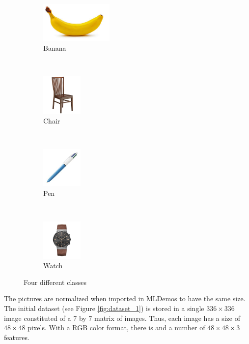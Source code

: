 \documentclass[a4paper,10pt]{article}
\begin{document}
\begin{figure}[H]
\centering
    \begin{subfigure}[t]{0.2\textwidth}
        \centering
        \includegraphics[height=2cm]{pictures/banana} 
        \caption{Banana}
        \label{fig:banana}
    \end{subfigure}%
    ~
    \begin{subfigure}[t]{0.2\textwidth}
        \centering
        \includegraphics[height=2cm]{pictures/chair2} 
        \caption{Chair}
        \label{fig:chair}
    \end{subfigure} 
    ~
    \begin{subfigure}[t]{0.2\textwidth}
        \centering
        \includegraphics[height=2cm]{pictures/stylo4} 
        \caption{Pen}
        \label{fig:pen}
    \end{subfigure}
    ~
    \begin{subfigure}[t]{0.2\textwidth}
        \centering
        \includegraphics[height=2cm]{pictures/watch2} 
        \caption{Watch}
        \label{fig:watch}
    \end{subfigure}   
\caption{Four different classes}
\label{fig:class}
\end{figure}


The pictures are normalized when imported in MLDemos to have the same size. The initial dataset (see Figure \ref{fig:dataset_1}) is stored in a single $336 \times 336 $ image constituted of a 7 by 7 matrix of images. Thus, each image has a size of $48 \times 48$ pixels. With a RGB color format, there is and a number of $48\times48\times3$ features.
\end{document}
